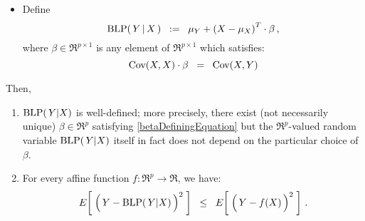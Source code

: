 \begin{theorem}
\begin{itemize}
\begin{equation*}
	\end{equation*}
\item
	Define
	\begin{equation*}
	\textnormal{BLP}(\,Y\,\vert\,X\,)
	\;\; := \;\;
		\mu_{Y} + \left(X - \mu_{X}\right)^{T}\cdot\beta\,,
	\end{equation*}
	where $\beta \in \Re^{p\times 1}$ is any element of $\Re^{p\times 1}$ which satisfies:
	\begin{equation}\label{betaDefiningEquation}
	\textnormal{Cov}(X,X)\cdot\beta \;\; = \;\; \textnormal{Cov}(X,Y)
	\end{equation}
\end{itemize}
Then, 
\begin{enumerate}
\item
	$\textnormal{BLP}(\,Y\vert X)$ is well-defined;
	more precisely, there exist (not necessarily unique)
	$\beta \in \Re^{p}$ satisfying \eqref{betaDefiningEquation} but
	the $\Re^{p}$-valued random variable $\textnormal{BLP}(\,Y\vert X)$ itself
	in fact does not depend on the particular choice of $\beta$.
\item
	For every affine function $f:\Re^{p}\longrightarrow\Re$, we have:
	\begin{equation*}
	E\!\left[\;\left(\,Y \overset{{\color{white}.}}{-} \blp(\,Y\vert X)\,\right)^{2}\;\right]
	\;\;\leq\;\;
	E\!\left[\;\left(\,Y \overset{{\color{white}.}}{-} f(X)\,\right)^{2}\;\right]\,.
	\end{equation*}
\end{enumerate}
\end{theorem}
\proof
